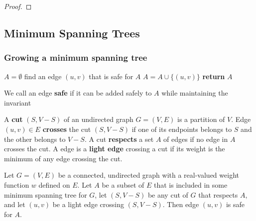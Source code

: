 \documentclass[11pt]{article}
\begin{document}
\begin{proof}

\end{proof}
\subsection{Minimum Spanning Trees}
\label{sec:org66c1988}
\subsubsection{Growing a minimum spanning tree}
\label{sec:org66aa787}
\begin{algorithmic}[1]
\State \(A=\emptyset\)
    \State find an edge \((u,v)\) that is safe for \(A\)
    \State \(A=A\cup\{(u,v)\}\)
\EndWhile
\State \textbf{return }\(A\)
\EndProcedure
\end{algorithmic}
We call an edge \textbf{safe} if it can be added safely to \(A\) while maintaining the invariant

A \textbf{cut} \((S,V-S)\) of an undirected graph \(G=(V,E)\) is a partition of \(V\). Edge \((u,v)\in E\)
\textbf{crosses} the cut \((S,V-S)\) if one of its endpoints belongs to \(S\) and the other belongs
to \(V-S\). A cut \textbf{respects} a set \(A\) of edges if no edge in \(A\) crosses the cut. A edge is a
\textbf{light edge} crossing a cut if its weight is the minimum of any edge crossing the cut.

\begin{theorem}[]
Let \(G=(V,E)\) be a connected, undirected graph with a real-valued weight function \(w\)
defined on \(E\). Let \(A\) be a subset of \(E\) that is included in some minimum spanning tree
for \(G\), let \((S,V-S)\) be any cut of \(G\) that respects \(A\), and let \((u,v)\) be a
light edge crossing \((S,V-S)\). Then edge \((u,v)\) is safe for \(A\).
\end{theorem}
\end{document}
